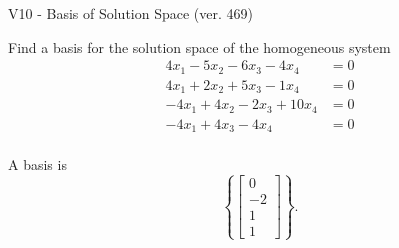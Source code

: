 \begin{exercise}
  \begin{exerciseTitle}V10 - Basis of Solution Space (ver. 469)\end{exerciseTitle}
  \begin{exerciseStatement}
    Find a basis for the solution space of the homogeneous system 
\begin{align*}
 4 x_ 1 -5 x_ 2 -6 x_ 3 -4 x_ 4 &= 0  \\ 
  4 x_ 1 + 2 x_ 2 + 5 x_ 3 -1 x_ 4 &= 0  \\ 
  -4 x_ 1 + 4 x_ 2 -2 x_ 3 + 10 x_ 4 &= 0  \\ 
  -4 x_ 1 + 4 x_ 3 -4 x_ 4 &= 0  \\ 
 \end{align*}


 
  \end{exerciseStatement}

  \begin{exerciseAnswer}
   A basis is   
\[\left\{\left[\begin{array}{c}
0 \\
-2 \\
1 \\
1
\end{array}\right]\right\}.\]

  


  \end{exerciseAnswer}
\end{exercise}